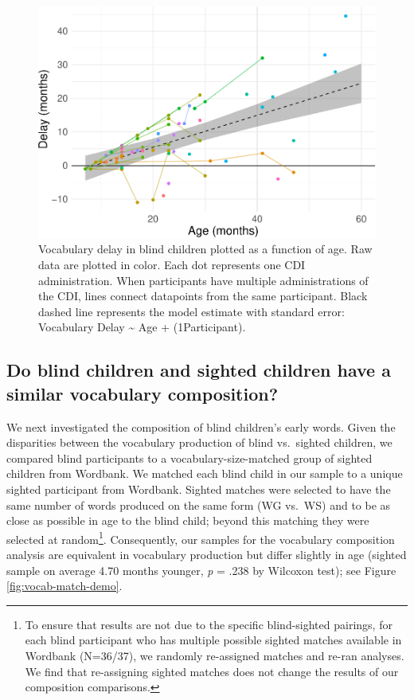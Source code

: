 \documentclass[
  man,floatsintext]{apa6}
\begin{document}
\begin{figure}
\centering
\includegraphics{VI_CDI_manuscript_files/figure-latex/longitudinal-plot-1.pdf}
\caption{\label{fig:longitudinal-plot}Vocabulary delay in blind children plotted as a function of age. Raw data are plotted in color. Each dot represents one CDI administration. When participants have multiple administrations of the CDI, lines connect datapoints from the same participant. Black dashed line represents the model estimate with standard error: Vocabulary Delay \textasciitilde{} Age + (1\textbar Participant).}
\end{figure}

\hypertarget{do-blind-children-and-sighted-children-have-a-similar-vocabulary-composition}{%
\subsection{Do blind children and sighted children have a similar vocabulary composition?}\label{do-blind-children-and-sighted-children-have-a-similar-vocabulary-composition}}

We next investigated the composition of blind children's early words. Given the disparities between the vocabulary production of blind vs.~sighted children, we compared blind participants to a vocabulary-size-matched group of sighted children from Wordbank. We matched each blind child in our sample to a unique sighted participant from Wordbank. Sighted matches were selected to have the same number of words produced on the same form (WG vs.~WS) and to be as close as possible in age to the blind child; beyond this matching they were selected at random\footnote{To ensure that results are not due to the specific blind-sighted pairings, for each blind participant who has multiple possible sighted matches available in Wordbank (N=36/37), we randomly re-assigned matches and re-ran analyses. We find that re-assigning sighted matches does not change the results of our composition comparisons.
}. Consequently, our samples for the vocabulary composition analysis are equivalent in vocabulary production but differ slightly in age (sighted sample on average 4.70 months younger, \emph{p} = .238 by Wilcoxon test); see Figure \ref{fig:vocab-match-demo}.
\end{document}
